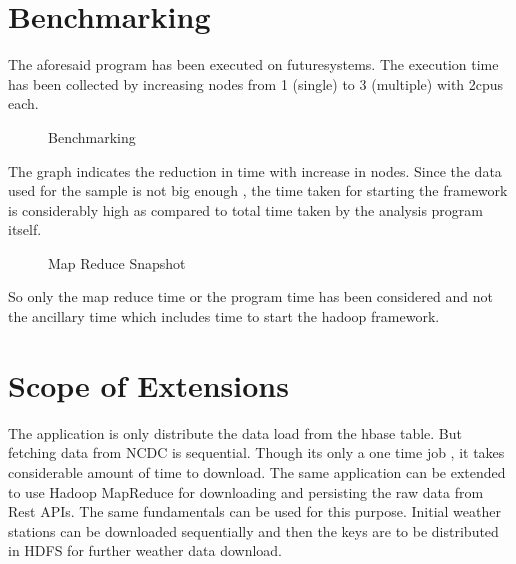 \documentclass[9pt,twocolumn,twoside]{../../styles/osajnl}
\begin{document}
\section{Benchmarking}
The aforesaid program has been executed on futuresystems. The execution time has been collected by increasing nodes from 1 (single) to 3 (multiple) with 2cpus each. 
\begin{figure}[htbp]
\centering
{}
\caption{Benchmarking}
\label{Reference:false-color}
\end{figure}
The graph indicates the reduction in time with increase in nodes. Since the data used for the sample is not big enough , the time taken for starting the framework is considerably high as compared to total time taken by the analysis program itself.
\begin{figure}[htbp]
\centering
{}
\caption{Map Reduce Snapshot}
\label{Reference:false-color}
\end{figure}
So only the map reduce time or the program time has been considered and not the ancillary time which includes time to start the hadoop framework. 

\section{Scope of Extensions}
The application is only distribute the data load from the hbase table. But fetching data from NCDC is sequential. Though its only a one time job , it takes considerable amount of time to download. The same application can be extended to use Hadoop MapReduce for downloading and persisting the raw data from Rest APIs. The same fundamentals can be used for this purpose. Initial weather stations can be downloaded sequentially and then the keys are to be distributed in HDFS for further weather data download. 
\end{document}
